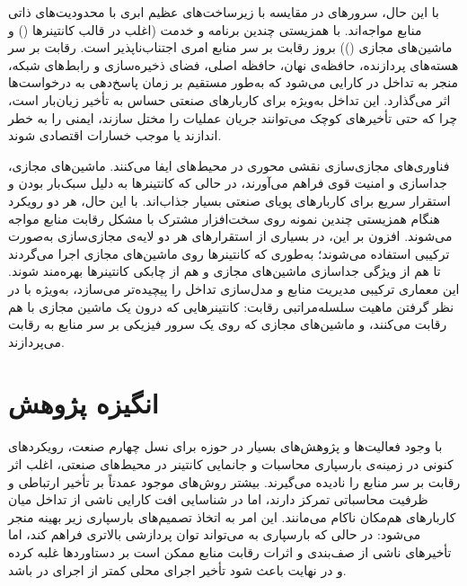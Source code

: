 با این حال، سرورهای  در مقایسه با زیرساخت‌های عظیم ابری با محدودیت‌های ذاتی منابع مواجه‌اند. با همزیستی چندین برنامه  و خدمت (اغلب در قالب کانتینرها () و ماشین‌های مجازی ()) بروز رقابت بر سر منابع امری اجتناب‌ناپذیر است. رقابت بر سر هسته‌های پردازنده، حافظه‌ی نهان، حافظه اصلی، فضای ذخیره‌سازی و رابط‌های شبکه، منجر به تداخل در کارایی می‌شود که به‌طور مستقیم بر زمان پاسخ‌دهی به درخواست‌ها اثر می‌گذارد. این تداخل به‌ویژه برای کاربارهای صنعتی حساس به تأخیر زیان‌بار است، چرا که حتی تأخیرهای کوچک می‌توانند جریان عملیات را مختل سازند، ایمنی را به خطر اندازند یا موجب خسارات اقتصادی شوند.

فناوری‌های مجازی‌سازی نقشی محوری در محیط‌های  ایفا می‌کنند. ماشین‌های مجازی، جداسازی و امنیت قوی فراهم می‌آورند، در حالی که کانتینرها به دلیل سبک‌بار بودن و استقرار سریع برای کاربارهای پویای صنعتی بسیار جذاب‌اند. با این حال، هر دو رویکرد هنگام همزیستی چندین نمونه روی سخت‌افزار مشترک با مشکل رقابت منابع مواجه می‌شوند. افزون بر این، در بسیاری از استقرارهای  هر دو لایه‌ی مجازی‌سازی به‌صورت ترکیبی استفاده می‌شوند؛ به‌طوری که کانتینرها روی ماشین‌های مجازی اجرا می‌گردند تا هم از ویژگی جداسازی ماشین‌های مجازی و هم از چابکی کانتینرها بهره‌مند شوند. این معماری ترکیبی مدیریت منابع و مدل‌سازی تداخل را پیچیده‌تر می‌سازد، به‌ویژه با در نظر گرفتن ماهیت سلسله‌مراتبی رقابت: کانتینرهایی که درون یک ماشین مجازی با هم رقابت می‌کنند، و ماشین‌های مجازی که روی یک سرور فیزیکی  بر سر منابع به رقابت می‌پردازند.

\section{انگیزه پژوهش}

با وجود فعالیت‌ها و پژوهش‌های بسیار در حوزه  برای نسل چهارم صنعت، رویکردهای کنونی در زمینه‌ی بارسپاری محاسبات و جانمایی کانتینر در محیط‌های صنعتی، اغلب اثر رقابت بر سر منابع را نادیده می‌گیرند. بیشتر روش‌های موجود عمدتاً بر تأخیر ارتباطی و ظرفیت محاسباتی تمرکز دارند، اما در شناسایی افت کارایی ناشی از تداخل میان کاربارهای هم‌مکان ناکام می‌مانند. این امر به اتخاذ تصمیم‌های بارسپاری زیر بهینه منجر می‌شود: در حالی که بارسپاری به  می‌تواند توان پردازشی بالاتری فراهم کند، اما تأخیرهای ناشی از صف‌بندی و اثرات رقابت منابع ممکن است بر دستاوردها غلبه کرده و در نهایت باعث شود تأخیر اجرای محلی کمتر از اجرای در  باشد.

